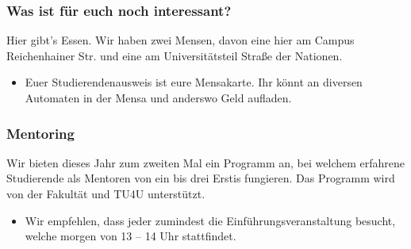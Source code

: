\begin{frame}
\frametitle{Was ist für euch noch interessant?}
\begin{block}{\vphantom{X}}
	Hier gibt's Essen. Wir haben zwei Mensen, davon eine hier am Campus Reichenhainer Str. und eine am Universitätsteil Straße der Nationen.
\end{block}
\begin{itemize}
	\item Euer Studierendenausweis ist eure Mensakarte. Ihr könnt an diversen Automaten in der Mensa und anderswo Geld aufladen.
\end{itemize}
\end{frame}

\begin{frame}
\frametitle{Mentoring}
\begin{block}{\vphantom{X}}
	Wir bieten dieses Jahr zum zweiten Mal ein Programm an, bei welchem erfahrene Studierende als Mentoren von ein bis drei Erstis fungieren. Das Programm wird von der Fakultät und TU4U unterstützt.
\end{block}
\begin{itemize}
	\item Wir empfehlen, dass jeder zumindest die Einführungsveranstaltung besucht, welche morgen von 13 -- 14 Uhr stattfindet.
\end{itemize}
\end{frame}



